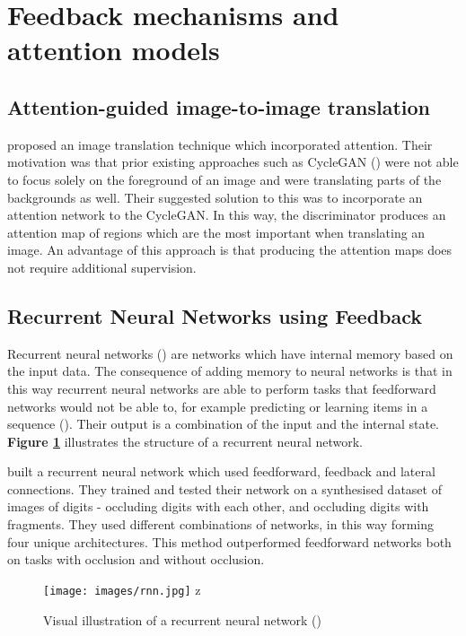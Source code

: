 \documentclass{l4proj}
\begin{document}
\section{Feedback mechanisms and attention models}
\subsection{Attention-guided image-to-image translation}
\label{lab:attention}
\cite{imagetransl} proposed an image translation technique which incorporated attention. Their motivation was that prior existing approaches such as CycleGAN  (\cite{cyclegan}) were not able to focus solely on the foreground of an image and were translating parts of the backgrounds as well. Their suggested solution to this was to incorporate an attention network to the CycleGAN. In this way, the discriminator produces an attention map of regions which are the most important when translating an image. An advantage of this approach is that producing the attention maps does not require additional supervision.

\subsection{Recurrent Neural Networks using Feedback}
\label{recfeedback}
Recurrent neural networks (\cite{rnn}) are networks which have internal memory based on the input data. The consequence of adding memory to neural networks is that in this way recurrent neural networks are able to perform tasks that feedforward networks would not be able to, for example predicting or learning items in a sequence (\cite{recurrent}). Their output is a combination of the input and the internal state.
\textbf{Figure \ref{fig:rnn}} illustrates the structure of a recurrent neural network.

\cite{feedbackrnn} built a recurrent neural network which used feedforward, feedback and lateral connections. They trained and tested their network on a synthesised dataset of images of digits - occluding digits with each other, and occluding digits with fragments. They used different combinations of networks, in this way forming four unique architectures. This method outperformed feedforward networks both on tasks with occlusion and without occlusion.

\begin{figure}[H]
    \centering
    \texttt{[image: images/rnn.jpg]}
    z\caption{Visual illustration of a recurrent neural network (\cite{rnngraph})}
    \label{fig:rnn} 
\end{figure}
\end{document}
